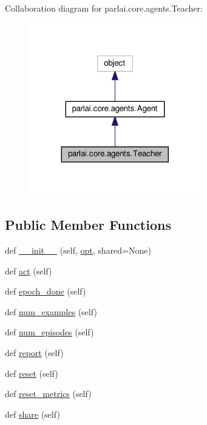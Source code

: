Collaboration diagram for parlai.\+core.\+agents.\+Teacher\+:
\nopagebreak
\begin{figure}[H]
\begin{center}
\leavevmode
\includegraphics[width=212pt]{d8/d69/classparlai_1_1core_1_1agents_1_1Teacher__coll__graph}
\end{center}
\end{figure}
\subsection*{Public Member Functions}
\begin{DoxyCompactItemize}
\item 
def \hyperlink{classparlai_1_1core_1_1agents_1_1Teacher_ab15a6b5c801681b96bcb9725df0c7c7d}{\+\_\+\+\_\+init\+\_\+\+\_\+} (self, \hyperlink{classparlai_1_1core_1_1agents_1_1Teacher_a3ce6243860ce978a897922863ed32fa4}{opt}, shared=None)
\item 
def \hyperlink{classparlai_1_1core_1_1agents_1_1Teacher_a3f4cbdfdddddb8776ab665f5f7ee63d6}{act} (self)
\item 
def \hyperlink{classparlai_1_1core_1_1agents_1_1Teacher_a4a2eda53b7b26f114ae3149b60f57845}{epoch\+\_\+done} (self)
\item 
def \hyperlink{classparlai_1_1core_1_1agents_1_1Teacher_a93370e4e99236e8ad267b40cd4437920}{num\+\_\+examples} (self)
\item 
def \hyperlink{classparlai_1_1core_1_1agents_1_1Teacher_aa35e171610f8dd8e6a2fd5a87ad91e10}{num\+\_\+episodes} (self)
\item 
def \hyperlink{classparlai_1_1core_1_1agents_1_1Teacher_aa0afab11fb5f3f26ac59576f064623a4}{report} (self)
\item 
def \hyperlink{classparlai_1_1core_1_1agents_1_1Teacher_a3b1fe4cf4ea53c9b2ce28435391ad081}{reset} (self)
\item 
def \hyperlink{classparlai_1_1core_1_1agents_1_1Teacher_a3f14618f0f49c57a6fbcb4f80f8a1de4}{reset\+\_\+metrics} (self)
\item 
def \hyperlink{classparlai_1_1core_1_1agents_1_1Teacher_a43cf8d0b49ef4ff150ceef0149c063c3}{share} (self)
\end{DoxyCompactItemize}
